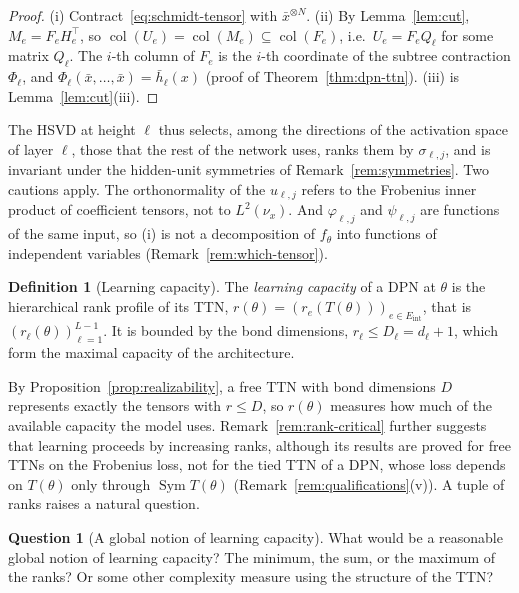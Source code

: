 \documentclass[11pt]{article}
\newcommand{\Sym}{\operatorname{Sym}}
\newcommand{\col}{\operatorname{col}}
\newcommand{\xb}{\bar{x}}
\newcommand{\hb}{\bar{h}}
\newcommand{\Eint}{E_{\mathrm{int}}}
\theoremstyle{definition}
\newtheorem{definition}[theorem]{Definition}
\newtheorem{question}[theorem]{Question}
\numberwithin{equation}{section}
\begin{document}
\begin{proof}
(i) Contract~\eqref{eq:schmidt-tensor} with $\xb^{\otimes N}$. (ii) By Lemma~\ref{lem:cut}, $M_e=F_eH_e^\top$, so $\col(U_e)=\col(M_e)\subseteq\col(F_e)$, i.e.\ $U_e=F_eQ_\ell$ for some matrix $Q_\ell$. The $i$-th column of $F_e$ is the $i$-th coordinate of the subtree contraction $\Phi_\ell$, and $\Phi_\ell(\xb,\dots,\xb)=\hb_\ell(x)$ (proof of Theorem~\ref{thm:dpn-ttn}). (iii) is Lemma~\ref{lem:cut}(iii).
\end{proof}

The HSVD at height $\ell$ thus selects, among the directions of the activation space of layer $\ell$, those that the rest of the network uses, ranks them by $\sigma_{\ell,j}$, and is invariant under the hidden-unit symmetries of Remark~\ref{rem:symmetries}. Two cautions apply. The orthonormality of the $u_{\ell,j}$ refers to the Frobenius inner product of coefficient tensors, not to $L^2(\nu_x)$. And $\varphi_{\ell,j}$ and $\psi_{\ell,j}$ are functions of the same input, so (i) is not a decomposition of $f_\theta$ into functions of independent variables (Remark~\ref{rem:which-tensor}).

\begin{definition}[Learning capacity]\label{def:capacity}
The \emph{learning capacity} of a DPN at $\theta$ is the hierarchical rank profile of its TTN, $r(\theta)=(r_e(T(\theta)))_{e\in\Eint}$, that is $(r_\ell(\theta))_{\ell=1}^{L-1}$. It is bounded by the bond dimensions, $r_\ell\le D_\ell=d_\ell+1$, which form the maximal capacity of the architecture.
\end{definition}

By Proposition~\ref{prop:realizability}, a free TTN with bond dimensions $D$ represents exactly the tensors with $r\le D$, so $r(\theta)$ measures how much of the available capacity the model uses. Remark~\ref{rem:rank-critical} further suggests that learning proceeds by increasing ranks, although its results are proved for free TTNs on the Frobenius loss, not for the tied TTN of a DPN, whose loss depends on $T(\theta)$ only through $\Sym T(\theta)$ (Remark~\ref{rem:qualifications}(v)). A tuple of ranks raises a natural question.

\begin{question}[A global notion of learning capacity]\label{q:capacity}
What would be a reasonable global notion of learning capacity? The minimum, the sum, or the maximum of the ranks? Or some other complexity measure using the structure of the TTN?
\end{question}
\end{document}
